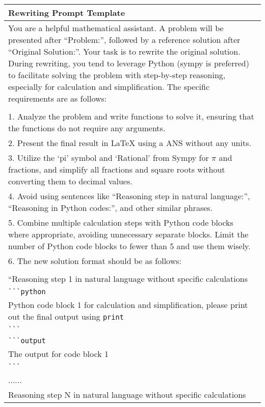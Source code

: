 \begin{table*}[htbp]
    \centering
    \footnotesize
    \begin{tabularx}{\textwidth}{|X|}
        \hline
        \textbf{Rewriting Prompt Template} \\ 
        \hline
        You are a helpful mathematical assistant. A problem will be presented after ``Problem:'', followed by a reference solution after ``Original Solution:''. Your task is to rewrite the original solution. During rewriting, you tend to leverage Python (sympy is preferred) to facilitate solving the problem with step-by-step reasoning, especially for calculation and simplification. The specific requirements are as follows: \\ 
        \\
        1. Analyze the problem and write functions to solve it, ensuring that the functions do not require any arguments. \\
        2. Present the final result in \LaTeX{} using a $\boxed{\text{ANS}}$ without any units. \\
        3. Utilize the `pi' symbol and `Rational' from Sympy for $\pi$ and fractions, and simplify all fractions and square roots without converting them to decimal values. \\
        4. Avoid using sentences like ``Reasoning step in natural language:'', ``Reasoning in Python codes:'', and other similar phrases. \\
        5. Combine multiple calculation steps with Python code blocks where appropriate, avoiding unnecessary separate blocks. Limit the number of Python code blocks to fewer than 5 and use them wisely. \\
        6. The new solution format should be as follows: \\
        \\
        ``Reasoning step 1 in natural language without specific calculations \\
        \verb|```python| \\
        Python code block 1 for calculation and simplification, please print out the final output using \verb|print| \\
        \verb|```| \\
        \verb|```output| \\
        The output for code block 1 \\
        \verb|```| \\
        ...... \\
        Reasoning step N in natural language without specific calculations \\

\end{tabularx}
\end{table*}
